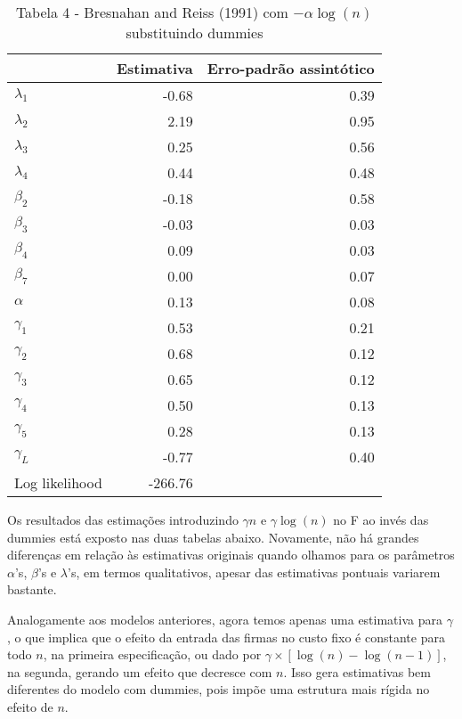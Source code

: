 \documentclass[
  12pt,
]{article}
\begin{document}
\begin{table}[H]

\caption{\label{tab:unnamed-chunk-13}Tabela 4 - Bresnahan and Reiss (1991) com $-\alpha \log(n)$ substituindo dummies}
\centering
\begin{tabular}[t]{lrr}
\toprule
  & Estimativa & Erro-padrão assintótico\\
\midrule
$\lambda_1$ & -0.68 & 0.39\\
$\lambda_2$ & 2.19 & 0.95\\
$\lambda_3$ & 0.25 & 0.56\\
$\lambda_4$ & 0.44 & 0.48\\
$\beta_2$ & -0.18 & 0.58\\
$\beta_3$ & -0.03 & 0.03\\
$\beta_4$ & 0.09 & 0.03\\
$\beta_7$ & 0.00 & 0.07\\
$\alpha$ & 0.13 & 0.08\\
$\gamma_1$ & 0.53 & 0.21\\
$\gamma_2$ & 0.68 & 0.12\\
$\gamma_3$ & 0.65 & 0.12\\
$\gamma_4$ & 0.50 & 0.13\\
$\gamma_5$ & 0.28 & 0.13\\
$\gamma_L$ & -0.77 & 0.40\\
Log likelihood & -266.76 & \\
\bottomrule
\end{tabular}
\end{table}

Os resultados das estimações introduzindo \(\gamma n\) e
\(\gamma \log(n)\) no F ao invés das dummies está exposto nas duas
tabelas abaixo. Novamente, não há grandes diferenças em relação às
estimativas originais quando olhamos para os parâmetros \(\alpha\)'s,
\(\beta\)'s e \(\lambda\)'s, em termos qualitativos, apesar das
estimativas pontuais variarem bastante.

Analogamente aos modelos anteriores, agora temos apenas uma estimativa
para \(\gamma\), o que implica que o efeito da entrada das firmas no
custo fixo é constante para todo \(n\), na primeira especificação, ou
dado por \(\gamma \times [\log(n) - \log(n-1)]\), na segunda, gerando um
efeito que decresce com \(n\). Isso gera estimativas bem diferentes do
modelo com dummies, pois impõe uma estrutura mais rígida no efeito de
\(n\).
\end{document}
